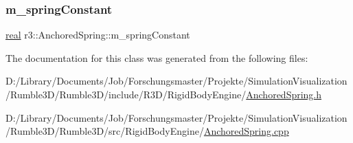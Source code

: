 \mbox{\label{classr3_1_1_anchored_spring_af17c024b5f8a025f5555946c60b52a67}} 
\subsubsection{\texorpdfstring{m\+\_\+spring\+Constant}{m\_springConstant}}
{\footnotesize\ttfamily \mbox{\hyperlink{namespacer3_ab2016b3e3f743fb735afce242f0dc1eb}{real}} r3\+::\+Anchored\+Spring\+::m\+\_\+spring\+Constant\hspace{0.3cm}{\ttfamily [protected]}}



The documentation for this class was generated from the following files\+:\begin{DoxyCompactItemize}
\item 
D\+:/\+Library/\+Documents/\+Job/\+Forschungsmaster/\+Projekte/\+Simulation\+Visualization/\+Rumble3\+D/\+Rumble3\+D/include/\+R3\+D/\+Rigid\+Body\+Engine/\mbox{\hyperlink{_anchored_spring_8h}{Anchored\+Spring.\+h}}\item 
D\+:/\+Library/\+Documents/\+Job/\+Forschungsmaster/\+Projekte/\+Simulation\+Visualization/\+Rumble3\+D/\+Rumble3\+D/src/\+Rigid\+Body\+Engine/\mbox{\hyperlink{_anchored_spring_8cpp}{Anchored\+Spring.\+cpp}}\end{DoxyCompactItemize}

